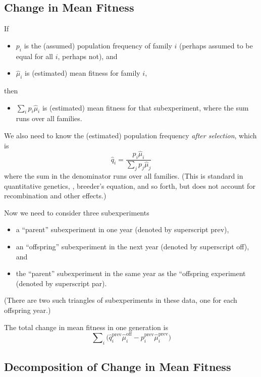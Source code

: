 \documentclass[11pt]{article}
\begin{document}
\subsection{Change in Mean Fitness}

If
\begin{itemize}
\item $p_i$ is the (assumed) population frequency of family $i$
    (perhaps assumed to be equal for all $i$, perhaps not), and
\item $\hat{\mu}_i$ is (estimated) mean fitness for family $i$,
\end{itemize}
then
\begin{itemize}
\item $\sum_i p_i \hat{\mu}_i$ is (estimated) mean fitness for
that subexperiment, where the sum runs over all families.
\end{itemize}

We also need to know the (estimated) population frequency
\emph{after selection}, which is
$$
   \hat{q}_i = \frac{p_i \hat{\mu}_i}{\sum_j p_j \hat{\mu}_j}
$$
where the sum in the denominator runs over all families.
(This is standard in quantitative genetics, \citet{lande-arnold},
breeder's equation,
and so forth, but does not account for recombination and other effects.)

Now we need to consider three subexperiments
\begin{itemize}
\item a ``parent'' subexperiment in one year (denoted by superscript prev),
\item an ``offspring'' subexperiment in the next year (denoted
    by superscript off), and
\item the ``parent'' subexperiment in the same year as the ``offspring
    experiment (denoted by superscript par).
\end{itemize}
(There are two such triangles of subexperiments in these data, one
for each offspring year.)

The total change in mean fitness in one generation is
\begin{equation} \label{eq:total-change}
   \sum\nolimits_i \bigl(
   \hat{q}_i^\text{prev} \hat{\mu}_i^\text{off}
   -
   p_i^\text{prev} \hat{\mu}_i^\text{prev}
   \bigr)
\end{equation}

\subsection{Decomposition of Change in Mean Fitness}
\end{document}
